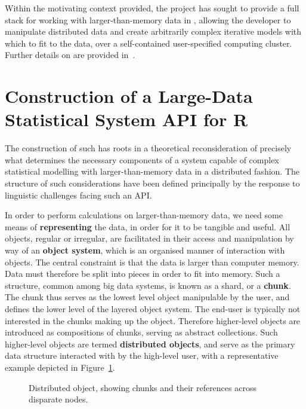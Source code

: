 \documentclass[letterpaper, inpress]{jds} %
\begin{document}
Within the motivating context provided, the  project has sought to provide a full stack for working with larger-than-memory data in , allowing the developer to manipulate distributed data and create arbitrarily complex iterative models with which to fit to the data, over a self-contained user-specified computing cluster. Further details on  are provided in~\citet{cairns2023}.

\section{Construction of a Large-Data Statistical System API for R}

The construction of such  has roots in a theoretical reconsideration of precisely what determines the necessary components of a system capable of complex statistical modelling with larger-than-memory data in a distributed fashion.
The structure of such considerations have been defined principally by the response to linguistic challenges facing such an API.

In order to perform calculations on larger-than-memory data, we need some means of \textbf{representing} the data, in order for it to be tangible and useful.
All objects, regular or irregular, are facilitated in their access and manipulation by way of an \textbf{object system}, which is an organised manner of interaction with objects.
The central constraint is that the data is larger than computer memory.
Data must therefore be split into pieces in order to fit into memory.
Such a structure, common among big data systems, is known as a shard, or a \textbf{chunk}. 
The chunk thus serves as the lowest level object manipulable by the user, and defines the lower level of the layered object system.
The end-user is typically not interested in the chunks making up the object.
Therefore higher-level objects are introduced as compositions of chunks, serving as abstract collections.
Such higher-level objects are termed \textbf{distributed objects}, and serve as the primary data structure interacted with by the high-level user, with a representative example depicted in Figure~\ref{fig:distobj}.

\begin{figure}[ht]
\begin{center}
    
\caption{Distributed object, showing chunks and their references across disparate nodes.}
\label{fig:distobj}
\end{center}
\end{figure}
\end{document}
